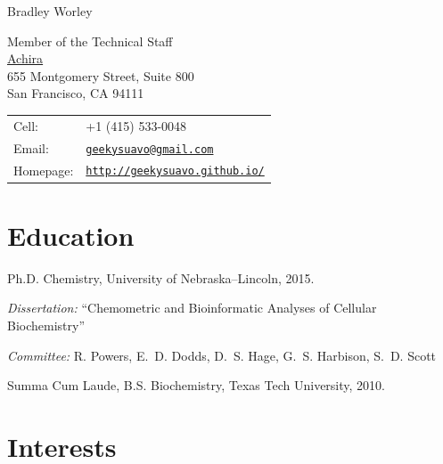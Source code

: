 \documentclass[letterpaper]{article}
\def\name{Bradley Worley}
\renewenvironment{itemize}{
  \begin{list}{}{
    \setlength{\leftmargin}{1.5em}
  }
}{
  \end{list}
}
\begin{document}
{\huge \name}
\vspace{0.25in}

\begin{minipage}{0.45\linewidth}
  Member of the Technical Staff \\
  \href{https://achira.ai/}{Achira} \\
  655 Montgomery Street, Suite 800 \\
  San Francisco, CA 94111
\end{minipage}
\begin{minipage}{0.45\linewidth}
  \begin{tabular}{ll}
    Cell: &  +1 (415) 533-0048 \\
    Email: & \href{mailto:geekysuavo@gmail.com}
                     {\tt geekysuavo@gmail.com} \\
    Homepage: & \href{http://geekysuavo.github.io/}
                 {\tt http://geekysuavo.github.io/} \\
  \end{tabular}
\end{minipage}


\section*{Education}

\begin{itemize}
  \item Ph.D. Chemistry, University of Nebraska--Lincoln, 2015.
  \begin{itemize}
    \item \emph{Dissertation:} ``Chemometric and Bioinformatic Analyses
      of Cellular Biochemistry''
    \item \emph{Committee:}
      R. Powers, E.~D. Dodds, D.~S. Hage,
      G.~S. Harbison, S.~D. Scott
  \end{itemize}
  \item Summa Cum Laude, B.S. Biochemistry, Texas Tech University, 2010.
\end{itemize}


\section*{Interests}
\end{document}
